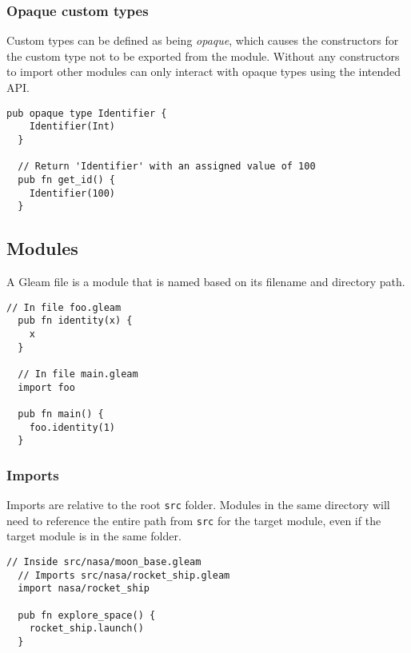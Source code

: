 \subsubsection*{\rmfamily Opaque custom types}

Custom types can be defined as being \emph{opaque}, which causes the constructors for
the custom type not to be exported from the module. Without any constructors to
import other modules can only interact with opaque types using the intended API.

\begin{lstlisting}[belowskip=-\baselineskip]
  pub opaque type Identifier {
    Identifier(Int)
  }
  
  // Return 'Identifier' with an assigned value of 100
  pub fn get_id() {
    Identifier(100)
  }
\end{lstlisting}

\vs
\subsection*{\rmfamily Modules}

A Gleam file is a module that is named based on its filename and directory path.

\begin{lstlisting}[belowskip=-\baselineskip]
  // In file foo.gleam
  pub fn identity(x) {
    x
  }
  
  // In file main.gleam
  import foo

  pub fn main() {
    foo.identity(1)
  }
\end{lstlisting}

\vs
\subsubsection*{\rmfamily Imports}

Imports are relative to the root 
\lstinline[language=Gleam, basicstyle=\normalsize]!src! folder.
Modules in the same directory will need to reference the entire path
from \lstinline[language=Gleam, basicstyle=\normalsize]!src! for the target module,
even if the target module is in the same folder.

\begin{lstlisting}[belowskip=-\baselineskip]
  // Inside src/nasa/moon_base.gleam
  // Imports src/nasa/rocket_ship.gleam
  import nasa/rocket_ship
  
  pub fn explore_space() {
    rocket_ship.launch()
  }
\end{lstlisting}

